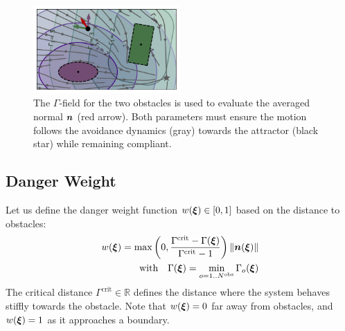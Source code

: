 \documentclass[conference]{IEEEtran}
\begin{document}
\begin{figure}
\centerline{\includegraphics[width=0.5\textwidth]{figures/normal_and_gamma_field_visualization}}
\caption{The $\Gamma$-field for the two obstacles is used to evaluate the averaged normal $\boldsymbol{n}$ (red arrow). 
Both parameters must ensure the motion follows the avoidance dynamics (gray) towards the attractor (black star) while remaining compliant.}
\label{fig:resultant_normal}
\end{figure}


\subsection{Danger Weight}
Let us define the danger weight function $w(\boldsymbol{\xi}) \in [0, 1]$ based on the distance to obstacles:
\begin{equation}
  \begin{split}
w(\vecs\xi) =
\max \left(0,  \frac{\Gamma^{\mathrm{crit}} - \Gamma(\vecs\xi)}{\Gamma^{\mathrm{crit}} - 1} \right) \| \vecs n(\vecs \xi) \| \\
\text{with} \quad
\Gamma(\vecs\xi) = \min_{o = 1..N^{\mathrm{obs}}} \Gamma_o(\vecs\xi)
\label{eq:weight_function}
\end{split}
\end{equation}
The critical distance $\Gamma^{\mathrm{crit}} \in \mathbb{R}$ defines the distance where the system behaves stiffly towards the obstacle.
Note that $w(\boldsymbol{\xi}) = 0$ far away from obstacles, and $w(\boldsymbol{\xi}) = 1$ as it approaches a boundary.
\end{document}
